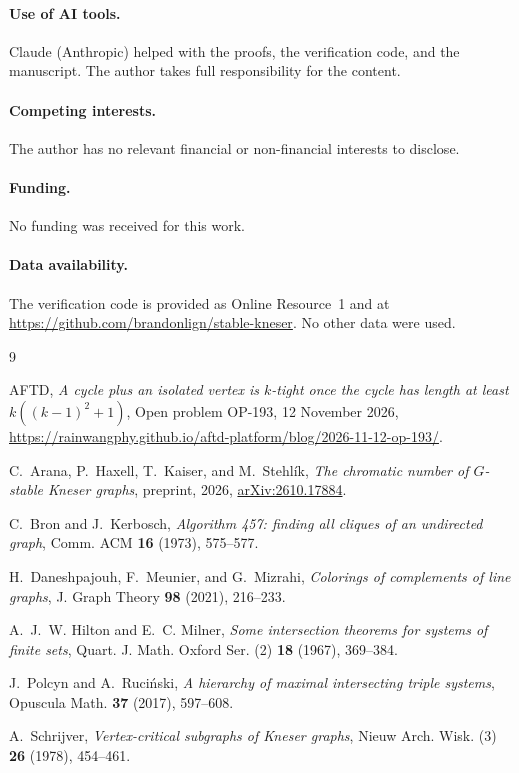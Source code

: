 \documentclass[11pt]{amsart}
\theoremstyle{definition}
\theoremstyle{remark}
\numberwithin{equation}{section}
\begin{document}
\paragraph{Use of AI tools.} Claude (Anthropic) helped with the proofs, the verification code, and the
manuscript. The author takes full responsibility for the content.

\paragraph{Competing interests.} The author has no relevant financial or non-financial
interests to disclose.

\paragraph{Funding.} No funding was received for this work.

\paragraph{Data availability.} The verification code is provided as Online
Resource~1 and at \url{https://github.com/brandonlign/stable-kneser}. No other data
were used.

\begin{thebibliography}{9}

AFTD, \emph{A cycle plus an isolated vertex is $k$-tight once the cycle has
length at least $k((k-1)^2+1)$}, Open problem OP-193, 12 November 2026,
\url{https://rainwangphy.github.io/aftd-platform/blog/2026-11-12-op-193/}.

C.~Arana, P.~Haxell, T.~Kaiser, and M.~Stehl\'ik, \emph{The chromatic number
of $G$-stable Kneser graphs}, preprint, 2026,
\href{https://arxiv.org/abs/2610.17884}{arXiv:2610.17884}.

C.~Bron and J.~Kerbosch, \emph{Algorithm 457: finding all cliques of an
undirected graph}, Comm. ACM \textbf{16} (1973), 575--577.

H.~Daneshpajouh, F.~Meunier, and G.~Mizrahi, \emph{Colorings of complements
of line graphs}, J. Graph Theory \textbf{98} (2021), 216--233.

A.~J.~W. Hilton and E.~C. Milner, \emph{Some intersection theorems for systems
of finite sets}, Quart. J. Math. Oxford Ser. (2) \textbf{18} (1967), 369--384.

J.~Polcyn and A.~Ruci\'nski, \emph{A hierarchy of maximal intersecting triple
systems}, Opuscula Math. \textbf{37} (2017), 597--608.

A.~Schrijver, \emph{Vertex-critical subgraphs of Kneser graphs}, Nieuw Arch.
Wisk. (3) \textbf{26} (1978), 454--461.

\end{thebibliography}
\end{document}
